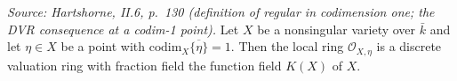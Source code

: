 \begin{lemma}


  \label{lem:smooth_codim_one_dvr}
  \textit{Source: Hartshorne, II.6, p.~130 (definition of regular in codimension one;
  the DVR consequence at a codim-1 point).}
  Let \(X\) be a nonsingular variety over \(\bar k\) and let \(\eta \in X\) be a point with
  \(\mathrm{codim}_X \overline{\{\eta\}} = 1\). Then the local ring \(\mathcal O_{X, \eta}\) is a
  discrete valuation ring with fraction field the function field \(K(X)\) of \(X\).
\end{lemma}

